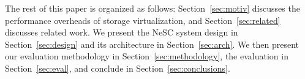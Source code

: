The rest of this paper is organized as follows:
Section~\ref{sec:motiv} discusses the performance overheads of storage virtualization, and  Section~\ref{sec:related} discusses related work.
We present the NeSC system design in Section~\ref{sec:design} and its architecture in Section~\ref{sec:arch}. We then present our evaluation methodology in Section~\ref{sec:methodology}, the evaluation in Section~\ref{sec:eval}, and conclude in Section~\ref{sec:conclusions}.



